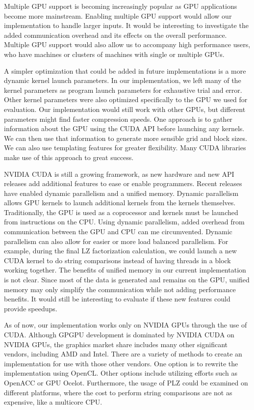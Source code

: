 Multiple GPU support is becoming increasingly popular as GPU applications become more mainstream.
Enabling multiple GPU support would allow our implementation to handle larger inputs.
It would be interesting to investigate the added communication overhead and its effects on the overall performance.
Multiple GPU support would also allow us to accompany high performance users, who have machines or clusters of machines with single or multiple GPUs.

A simpler optimization that could be added in future implementations is a more dynamic kernel launch parameters.
In our implementation, we left many of the kernel parameters as program launch parameters for exhaustive trial and error.
Other kernel parameters were also optimized specifically to the GPU we used for evaluation.
Our implementation would still work with other GPUs, but different parameters might find faster compression speeds.
One approach is to gather information about the GPU using the CUDA API before launching any kernels.
We can then use that information to generate more sensible grid and block sizes.
We can also use templating features for greater flexibility.
Many CUDA libraries make use of this approach to great success.

NVIDIA CUDA is still a growing framework, as new hardware and new API releases add additional features to ease or enable programmers.
Recent releases have enabled dynamic parallelism and a unified memory.
Dynamic parallelism allows GPU kernels to launch additional kernels from the kernels themselves.
Traditionally, the GPU is used as a coprocessor and kernels must be launched from instructions on the CPU.
Using dynamic parallelism, added overhead from communication between the GPU and CPU can me circumvented.
Dynamic parallelism can also allow for easier or more load balanced parallelism.
For example, during the final LZ factorization calculation, we could launch a new CUDA kernel to do string comparisons instead of having threads in a block working together.
The benefits of unified memory in our current implementation is not clear.
Since most of the data is generated and remains on the GPU, unified memory may only simplify the communication while not adding performance benefits.
It would still be interesting to evaluate if these new features could provide speedups.

As of now, our implementation works only on NVIDIA GPUs through the use of CUDA.
Although GPGPU development is dominated by NVIDIA CUDA on NVIDIA GPUs, the graphics market share includes many other significant vendors, including AMD and Intel.
There are a variety of methods to create an implementation for use with those other vendors.
One option is to rewrite the implementation using OpenCL.
Other options include utilizing efforts such as OpenACC or GPU Ocelot.
Furthermore, the usage of PLZ could be examined on different platforms, where the cost to perform string comparisons are not as expensive, like a multicore CPU.
